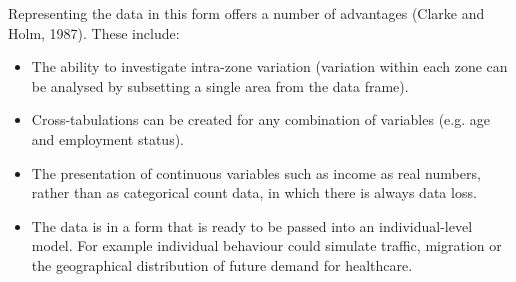 \documentclass[a4paper,10pt]{article}
\begin{document}
Representing the data in this form offers a number of advantages (Clarke and Holm, 1987). These include:
\begin{itemize}
 \item The ability to investigate intra-zone variation (variation within each zone can be analysed
 by subsetting a single area from the data frame).
\item Cross-tabulations can be created for any combination of variables (e.g. age and employment status).
\item The presentation of continuous variables such as income as real numbers, 
rather than as categorical count data, in which there is always data loss.
\item The data is in a form that is ready to be passed into an individual-level model.
For example individual behaviour could simulate traffic, migration or the geographical distribution of future demand for healthcare.
\end{itemize}

\end{document}
